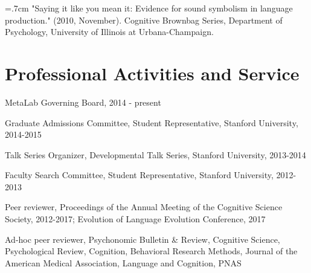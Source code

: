 \documentclass[letterpaper]{article}
\renewenvironment{itemize}{
  \begin{list}{}{
    \setlength{\leftmargin}{1.5em}
  }
}{
  \end{list}
}
\begin{document}
\hangindent=.7cm "Saying it like you mean it: Evidence for sound symbolism in language production." (2010, November). Cognitive Brownbag Series, Department of Psychology, University of Illinois at Urbana-Champaign.

 \singlespacing


\section*{Professional Activities and Service}
\begin{itemize}
\item MetaLab Governing Board, 2014 - present
\item Graduate Admissions Committee, Student Representative, Stanford University, 2014-2015
\item  Talk Series Organizer, Developmental Talk Series, Stanford University, 2013-2014
\item Faculty Search Committee,  Student Representative,  Stanford University, 2012-2013
\item Peer reviewer, Proceedings of the Annual Meeting of the Cognitive Science Society, 2012-2017; Evolution of Language Evolution Conference, 2017
\item Ad-hoc peer reviewer, Psychonomic Bulletin \& Review, Cognitive Science, Psychological Review, Cognition, Behavioral Research Methods,  Journal of the American Medical Association, Language and Cognition, PNAS
\end{itemize}



\end{document}
